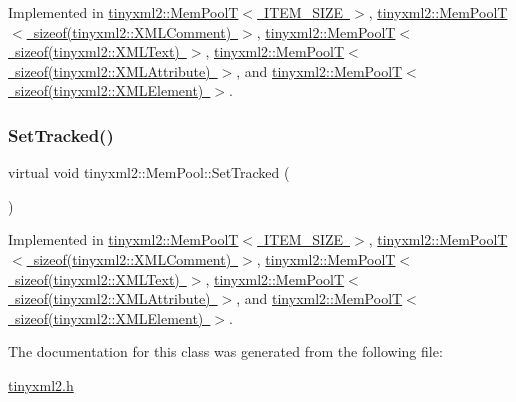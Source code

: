 Implemented in \mbox{\hyperlink{classtinyxml2_1_1_mem_pool_t_a54e4d9b343459ef1731314a99877ff35}{tinyxml2\+::\+Mem\+Pool\+T$<$ I\+T\+E\+M\+\_\+\+S\+I\+Z\+E $>$}}, \mbox{\hyperlink{classtinyxml2_1_1_mem_pool_t_a54e4d9b343459ef1731314a99877ff35}{tinyxml2\+::\+Mem\+Pool\+T$<$ sizeof(tinyxml2\+::\+X\+M\+L\+Comment) $>$}}, \mbox{\hyperlink{classtinyxml2_1_1_mem_pool_t_a54e4d9b343459ef1731314a99877ff35}{tinyxml2\+::\+Mem\+Pool\+T$<$ sizeof(tinyxml2\+::\+X\+M\+L\+Text) $>$}}, \mbox{\hyperlink{classtinyxml2_1_1_mem_pool_t_a54e4d9b343459ef1731314a99877ff35}{tinyxml2\+::\+Mem\+Pool\+T$<$ sizeof(tinyxml2\+::\+X\+M\+L\+Attribute) $>$}}, and \mbox{\hyperlink{classtinyxml2_1_1_mem_pool_t_a54e4d9b343459ef1731314a99877ff35}{tinyxml2\+::\+Mem\+Pool\+T$<$ sizeof(tinyxml2\+::\+X\+M\+L\+Element) $>$}}.

\mbox{\label{classtinyxml2_1_1_mem_pool_ac5804dd1387b2e4de5eef710076a0db1}} 
\subsubsection{\texorpdfstring{Set\+Tracked()}{SetTracked()}}
{\footnotesize\ttfamily virtual void tinyxml2\+::\+Mem\+Pool\+::\+Set\+Tracked (\begin{DoxyParamCaption}{ }\end{DoxyParamCaption})\hspace{0.3cm}{\ttfamily [pure virtual]}}



Implemented in \mbox{\hyperlink{classtinyxml2_1_1_mem_pool_t_aee3c611215ae08cce41a940bf2763027}{tinyxml2\+::\+Mem\+Pool\+T$<$ I\+T\+E\+M\+\_\+\+S\+I\+Z\+E $>$}}, \mbox{\hyperlink{classtinyxml2_1_1_mem_pool_t_aee3c611215ae08cce41a940bf2763027}{tinyxml2\+::\+Mem\+Pool\+T$<$ sizeof(tinyxml2\+::\+X\+M\+L\+Comment) $>$}}, \mbox{\hyperlink{classtinyxml2_1_1_mem_pool_t_aee3c611215ae08cce41a940bf2763027}{tinyxml2\+::\+Mem\+Pool\+T$<$ sizeof(tinyxml2\+::\+X\+M\+L\+Text) $>$}}, \mbox{\hyperlink{classtinyxml2_1_1_mem_pool_t_aee3c611215ae08cce41a940bf2763027}{tinyxml2\+::\+Mem\+Pool\+T$<$ sizeof(tinyxml2\+::\+X\+M\+L\+Attribute) $>$}}, and \mbox{\hyperlink{classtinyxml2_1_1_mem_pool_t_aee3c611215ae08cce41a940bf2763027}{tinyxml2\+::\+Mem\+Pool\+T$<$ sizeof(tinyxml2\+::\+X\+M\+L\+Element) $>$}}.



The documentation for this class was generated from the following file\+:\begin{DoxyCompactItemize}
\item 
\mbox{\hyperlink{tinyxml2_8h}{tinyxml2.\+h}}\end{DoxyCompactItemize}
